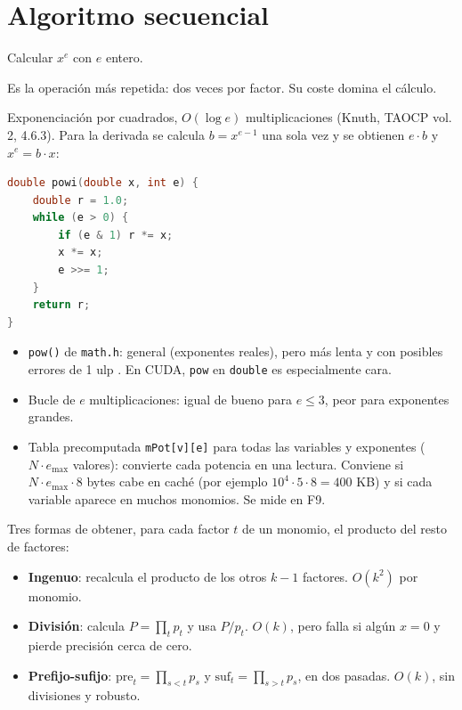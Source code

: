\section{Algoritmo secuencial}\label{tema:sec}

\que Calcular $x^e$ con $e$ entero.

\porque Es la operación más repetida: dos veces por factor. Su coste domina el cálculo.

\como Exponenciación por cuadrados, $O(\log e)$ multiplicaciones (Knuth, TAOCP vol. 2, 4.6.3). Para la derivada se calcula $b=x^{e-1}$ una sola vez y se obtienen $e\cdot b$ y $x^e=b\cdot x$:
\begin{lstlisting}[language=C]
double powi(double x, int e) {
    double r = 1.0;
    while (e > 0) {
        if (e & 1) r *= x;
        x *= x;
        e >>= 1;
    }
    return r;
}
\end{lstlisting}

\alt
\begin{itemize}
\item \texttt{pow()} de \texttt{math.h}: general (exponentes reales), pero más lenta y con posibles errores de 1 ulp \pv. En CUDA, \texttt{pow} en \texttt{double} es especialmente cara.
\item Bucle de $e$ multiplicaciones: igual de bueno para $e\le3$, peor para exponentes grandes.
\item Tabla precomputada \texttt{mPot[v][e]} para todas las variables y exponentes ($N\cdot e_{\max}$ valores): convierte cada potencia en una lectura. Conviene si $N\cdot e_{\max}\cdot8$ bytes cabe en caché (por ejemplo $10^4\cdot5\cdot8=400$ KB) y si cada variable aparece en muchos monomios. Se mide en F9.
\end{itemize}

\que Tres formas de obtener, para cada factor $t$ de un monomio, el producto del resto de factores:
\begin{itemize}
\item \textbf{Ingenuo}: recalcula el producto de los otros $k-1$ factores. $O(k^2)$ por monomio.
\item \textbf{División}: calcula $P=\prod_t p_t$ y usa $P/p_t$. $O(k)$, pero falla si algún $x=0$ y pierde precisión cerca de cero.
\item \textbf{Prefijo-sufijo}: $\text{pre}_t=\prod_{s<t}p_s$ y $\text{suf}_t=\prod_{s>t}p_s$, en dos pasadas. $O(k)$, sin divisiones y robusto.
\end{itemize}

